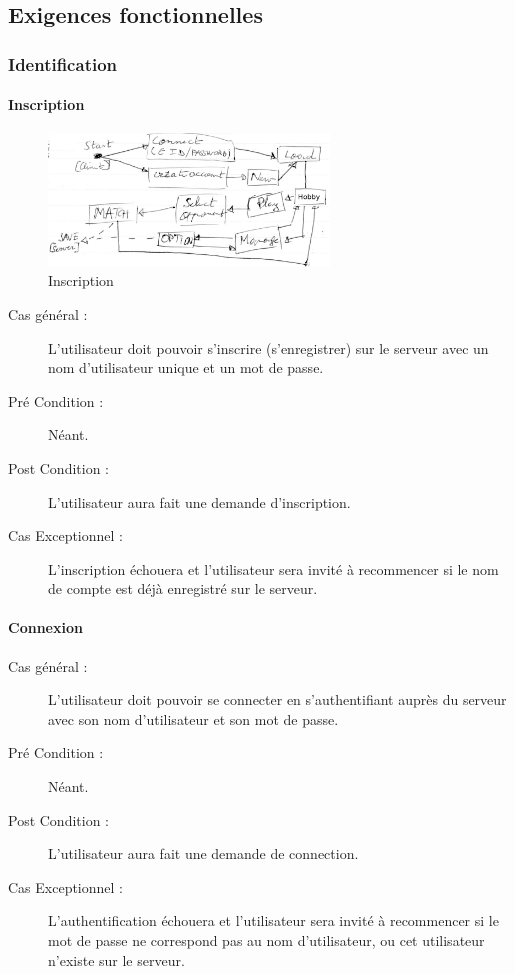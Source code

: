 \documentclass[a4paper]{article}
\begin{document}
\subsection{Exigences fonctionnelles}

\subsubsection{Identification}
\paragraph{Inscription}
\begin{figure}[h]
   \caption{\label{1} Inscription}
   \begin{center}
   \includegraphics[height=100pt]{../pv/pv1/schema1_pv1.jpg}
   \end{center}
\end{figure}
\begin{description}
\item[Cas général :] L'\gls{utilisateur} doit pouvoir s'inscrire (s'enregistrer) sur le \gls{serveur} avec un nom d'\gls{utilisateur} unique et un mot de passe.
\item[Pré Condition  :] Néant.
\item[Post Condition :] L'utilisateur aura fait une demande d'inscription.
\item[Cas Exceptionnel :] L'inscription échouera et l'\gls{utilisateur} sera invité à recommencer si le nom de compte est déjà enregistré sur le \gls{serveur}.
\end{description}

\paragraph{Connexion}
\begin{description}
\item[Cas général :] L'\gls{utilisateur} doit pouvoir se connecter en s'authentifiant auprès du \gls{serveur} avec son nom d'\gls{utilisateur} et son mot de passe.
\item[Pré Condition  :] Néant.
\item[Post Condition :] L'utilisateur aura fait une demande de connection.
\item[Cas Exceptionnel :] L'authentification échouera et l'\gls{utilisateur} sera invité à recommencer si le mot de passe ne correspond pas au nom d'\gls{utilisateur}, ou cet \gls{utilisateur} n'existe sur le \gls{serveur}.
\end{description}
\end{document}
